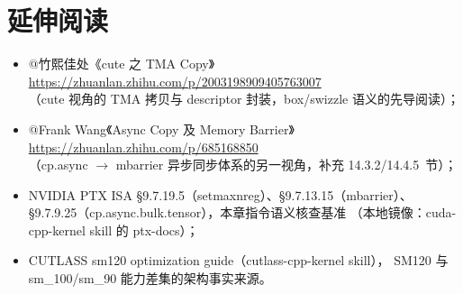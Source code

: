 \section*{延伸阅读}

\begin{itemize}
  \item @竹熙佳处《cute 之 TMA Copy》\\
        \url{https://zhuanlan.zhihu.com/p/2003198909405763007}\\
        （cute 视角的 TMA 拷贝与 descriptor 封装，box/swizzle 语义的先导阅读）；
  \item @Frank Wang《Async Copy 及 Memory Barrier》\\
        \url{https://zhuanlan.zhihu.com/p/685168850}\\
        （cp.async $\to$ mbarrier 异步同步体系的另一视角，补充 14.3.2/14.4.5~节）；
  \item NVIDIA PTX ISA §9.7.19.5（setmaxnreg）、§9.7.13.15（mbarrier）、
        §9.7.9.25（cp.async.bulk.tensor），本章指令语义核查基准
        （本地镜像：cuda-cpp-kernel skill 的 ptx-docs）；
  \item CUTLASS sm120 optimization guide（cutlass-cpp-kernel skill），
        SM120 与 sm\_100/sm\_90 能力差集的架构事实来源。
\end{itemize}
